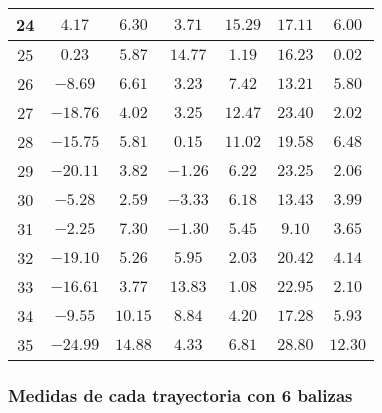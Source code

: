 \begin{table}[H]
\begin{tabular}{|c|c|c|c|c|c|c|}
                        24  & $4.17$    &  $6.30$   &  $3.71$    &  $15.29$  & $17.11$  &  $6.00$   \\ \hline
                        25  & $0.23$    &  $5.87$   &  $14.77$   &  $1.19$   & $16.23$  &  $0.02$   \\ \hline
                        26  & $-8.69$   &  $6.61$   &  $3.23$    &  $7.42$   & $13.21$  &  $5.80$   \\ \hline
                        27  & $-18.76$  &  $4.02$   &  $3.25$    &  $12.47$  & $23.40$  &  $2.02$   \\ \hline
                        28  & $-15.75$  &  $5.81$   &  $0.15$    &  $11.02$  & $19.58$  &  $6.48$   \\ \hline
                        29  & $-20.11$  &  $3.82$   &  $-1.26$   &  $6.22$   & $23.25$  &  $2.06$   \\ \hline
                        30  & $-5.28$   &  $2.59$   &  $-3.33$   &  $6.18$   & $13.43$  &  $3.99$   \\ \hline
                        31  & $-2.25$   &  $7.30$   &  $-1.30$   &  $5.45$   & $9.10$   &  $3.65$   \\ \hline
                        32  & $-19.10$  &  $5.26$   &  $5.95$    &  $2.03$   & $20.42$  &  $4.14$   \\ \hline
                        33  & $-16.61$  &  $3.77$   &  $13.83$   &  $1.08$   & $22.95$  &  $2.10$   \\ \hline
                        34  & $-9.55$   &  $10.15$  &  $8.84$    &  $4.20$   & $17.28$  &  $5.93$   \\ \hline
                        35  & $-24.99$  &  $14.88$  &  $4.33$    &  $6.81$   & $28.80$  &  $12.30$  \\ \hline
        \end{tabular}
    \label{tab:media_lab_6_total}
\end{table}

\newpage
\subsubsection{Medidas de cada trayectoria con 6 balizas}


